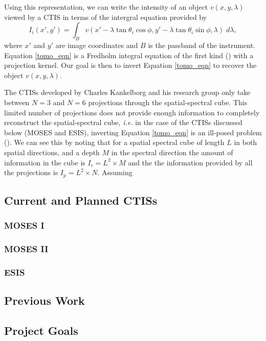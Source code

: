 \documentclass{article}
\begin{document}
			Using this representation, we can write the intensity of an object $v(x,y,\lambda)$ viewed by a CTIS in terms of the intergral equation provided by \cite{fox1}
			\begin{equation}
				I_i (x',y') = \int_B v(x' - \lambda \tan \theta_i \cos \phi, y' - \lambda \tan \theta_i \sin \phi, \lambda) \; d\lambda,
				\label{tomo_eqn}
			\end{equation}
			where $x'$ and $y'$ are image coordinates and $B$ is the passband of the instrument. Equation \ref{tomo_eqn} is a Fredholm integral equation of the first kind (\cite{RHB}) with a projection kernel. Our goal is then to invert Equation \ref{tomo_eqn} to recover the object $v(x,y,\lambda)$.
			
			The CTISs developed by Charles Kankelborg and his research group only take between $N=3$ and $N=6$ projections through the spatial-spectral cube. This limited number of projections does not provide enough information to completely reconstruct the spatial-spectral cube, \textit{i.e.} in the case of the CTISs discussed below (MOSES and ESIS), inverting Equation \ref{tomo_eqn} is an ill-posed problem (\cite{inversion}). We can see this by noting that for a spatial spectral cube of length $L$ in both spatial directions, and a depth $M$ in the spectral direction the amount of information in the cube is $I_c = L^2 \times M$ and the the information provided by all the projections is $I_p = L^2 \times N$. Assuming 
			
		\subsection{Current and Planned CTISs}
			
			\subsubsection{MOSES I}
			\subsubsection{MOSES II}
			\subsubsection{ESIS}
		\subsection{Previous Work}
			\label{pwork}
		\subsection{Project Goals}
\end{document}
